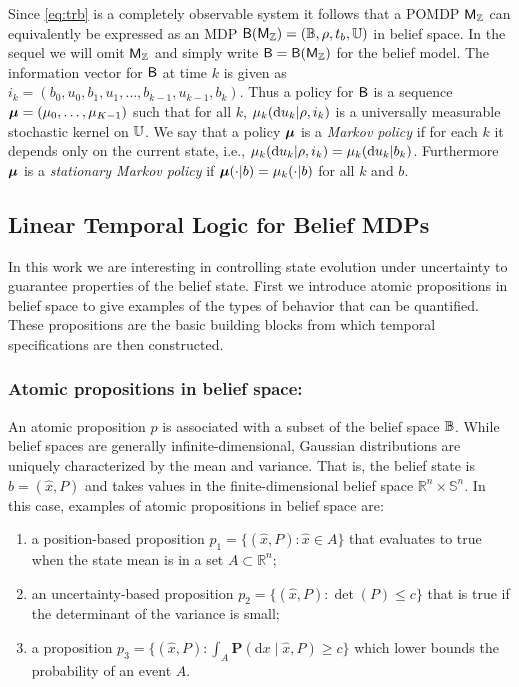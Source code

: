 \documentclass{ifacconf}
\begin{document}
Since \eqref{eq:trb} is a completely observable system it follows that a POMDP $\mathsf{M}_{{\mathbb{Z}}}$ can equivalently be expressed as an MDP $\mathsf{B}(\mathsf{M}_{{\mathbb{Z}}}) = (\mathbb{B}, \rho, t_b, {\mathbb{U}})$ in belief space. In the sequel we will omit $\mathsf{M}_{{\mathbb{Z}}}$ and simply write $\mathsf{B} = \mathsf{B}(\mathsf{M}_{{\mathbb{Z}}})$ for the belief model. The information vector for $\mathsf{B}$ at time $k$ is given as $i_k=(b_0, u_0, b_1, u_1, \ldots, b_{k-1}, u_{k-1}, b_k)$. Thus a policy for $\mathsf{B}$ is a sequence ${\boldsymbol{\mu}}=({\mu}_0,\ldots,{\mu}_{K-1})$ such that for all $k$, ${\mu}_k(\mathrm{d}u_k|\rho, i_k)$ is a universally measurable stochastic kernel on ${\mathbb{U}}$.	We say that a policy ${\boldsymbol{\mu}}$ is a \emph{Markov policy} if for each $k$ it depends only on the current state, i.e., ${\mu}_k(\mathrm{d} u_k|\rho, i_k) = {\mu}_k(\mathrm{d} u_k| b_k)$. Furthermore ${\boldsymbol{\mu}}$ is a \emph{stationary Markov policy} if ${\boldsymbol{\mu}}(\cdot | b)= {\mu}_k( \cdot |b)$ for all $k$ and $b$.


\subsection{Linear Temporal Logic for Belief MDPs}

In this work we are interesting in controlling state evolution under uncertainty to guarantee properties of the belief state. First we introduce atomic propositions in belief space to give examples of the types of behavior that can be quantified. These propositions are the basic building blocks from which temporal specifications are then constructed.
    
\subsubsection{Atomic propositions in belief space:}

An atomic proposition $p$ is associated with a subset of the belief space $\mathbb{B}$. While belief spaces are generally infinite-dimensional, Gaussian distributions are uniquely characterized by the mean and variance. That is, the belief state is $b = (\hat x, P)$ and takes values in the finite-dimensional belief space $\mathbb{R}^n \times \mathbb{S}^n$. In this case, examples of atomic propositions in belief space are:
\begin{enumerate}
  \item a position-based proposition $p_1 = \{ (\hat x, P) : \hat x \in A \}$ that evaluates to true when the state mean is in a set $A \subset \mathbb{R}^n$; 
  \item an uncertainty-based proposition $p_2 = \{ (\hat x, P) : \det(P) \leq c \}$ that is true if the determinant of the variance is small; 
  \item a proposition $p_3 = \{ (\hat x, P) : \int_{A} \mathbf{P}( \mathrm{d} x \mid \hat x, P) \geq c \}$ which lower bounds the probability of an event $A$. 
\end{enumerate}
\end{document}
